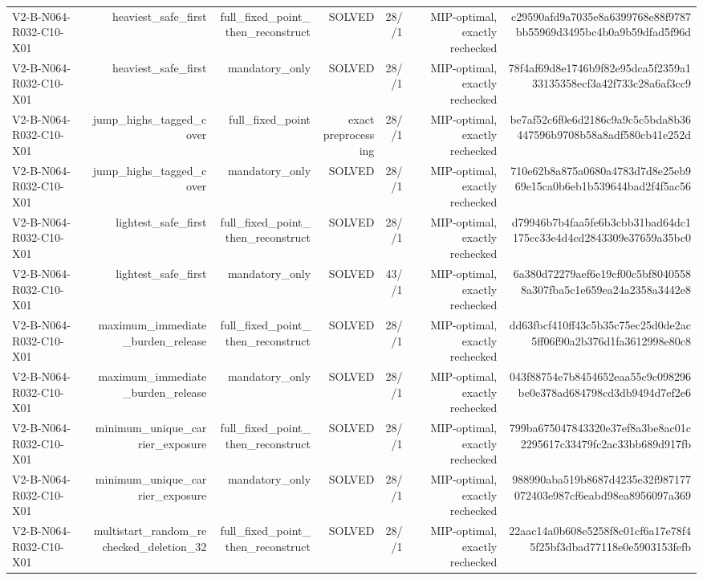 {\begin{longtable}{lrrrrrr}
V2-B-N064-R032-C10-X01 & heaviest\_safe\_first & full\_fixed\_point\_then\_reconstruct & SOLVED & 28//1 & MIP-optimal, exactly rechecked & c29590afd9a7035e8a6399768e88f9787bb55969d3495bc4b0a9b59dfad5f96d \\
V2-B-N064-R032-C10-X01 & heaviest\_safe\_first & mandatory\_only & SOLVED & 28//1 & MIP-optimal, exactly rechecked & 78f4af69d8e1746b9f82e95dca5f2359a133135358ecf3a42f733c28a6af3cc9 \\
V2-B-N064-R032-C10-X01 & jump\_highs\_tagged\_cover & full\_fixed\_point & exact preprocessing & 28//1 & MIP-optimal, exactly rechecked & be7af52c6f0e6d2186c9a9c5c5bda8b36447596b9708b58a8adf580cb41e252d \\
V2-B-N064-R032-C10-X01 & jump\_highs\_tagged\_cover & mandatory\_only & SOLVED & 28//1 & MIP-optimal, exactly rechecked & 710e62b8a875a0680a4783d7d8e25eb969e15ca0b6eb1b539644bad2f4f5ac56 \\
V2-B-N064-R032-C10-X01 & lightest\_safe\_first & full\_fixed\_point\_then\_reconstruct & SOLVED & 28//1 & MIP-optimal, exactly rechecked & d79946b7b4faa5fe6b3cbb31bad64dc1175cc33e4d4cd2843309e37659a35bc0 \\
V2-B-N064-R032-C10-X01 & lightest\_safe\_first & mandatory\_only & SOLVED & 43//1 & MIP-optimal, exactly rechecked & 6a380d72279aef6e19cf00c5bf80405588a307fba5c1e659ea24a2358a3442e8 \\
V2-B-N064-R032-C10-X01 & maximum\_immediate\_burden\_release & full\_fixed\_point\_then\_reconstruct & SOLVED & 28//1 & MIP-optimal, exactly rechecked & dd63fbcf410ff43c5b35c75ec25d0de2ac5ff06f90a2b376d1fa3612998e80c8 \\
V2-B-N064-R032-C10-X01 & maximum\_immediate\_burden\_release & mandatory\_only & SOLVED & 28//1 & MIP-optimal, exactly rechecked & 043f88754e7b8454652eaa55c9c098296be0e378ad684798cd3db9494d7ef2e6 \\
V2-B-N064-R032-C10-X01 & minimum\_unique\_carrier\_exposure & full\_fixed\_point\_then\_reconstruct & SOLVED & 28//1 & MIP-optimal, exactly rechecked & 799ba675047843320e37ef8a3be8ac01c2295617c33479fc2ac33bb689d917fb \\
V2-B-N064-R032-C10-X01 & minimum\_unique\_carrier\_exposure & mandatory\_only & SOLVED & 28//1 & MIP-optimal, exactly rechecked & 988990aba519b8687d4235e32f987177072403e987cf6eabd98ea8956097a369 \\
V2-B-N064-R032-C10-X01 & multistart\_random\_rechecked\_deletion\_32 & full\_fixed\_point\_then\_reconstruct & SOLVED & 28//1 & MIP-optimal, exactly rechecked & 22aac14a0b608e5258f8c01cf6a17e78f45f25bf3dbad77118e0e5903153fefb \\

\end{longtable}}

